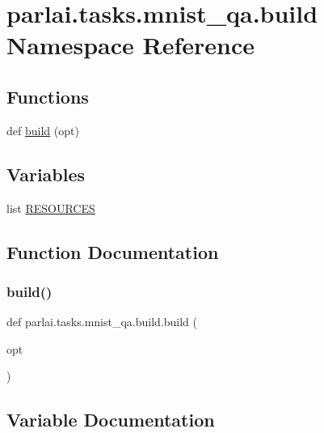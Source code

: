 \hypertarget{namespaceparlai_1_1tasks_1_1mnist__qa_1_1build}{}\section{parlai.\+tasks.\+mnist\+\_\+qa.\+build Namespace Reference}
\label{namespaceparlai_1_1tasks_1_1mnist__qa_1_1build}
\subsection*{Functions}
\begin{DoxyCompactItemize}
\item 
def \hyperlink{namespaceparlai_1_1tasks_1_1mnist__qa_1_1build_a76b349ca8131ab96d2e9991090ec92bb}{build} (opt)
\end{DoxyCompactItemize}
\subsection*{Variables}
\begin{DoxyCompactItemize}
\item 
list \hyperlink{namespaceparlai_1_1tasks_1_1mnist__qa_1_1build_a8199288cab0278a6409a158b930adc23}{R\+E\+S\+O\+U\+R\+C\+ES}
\end{DoxyCompactItemize}


\subsection{Function Documentation}
\mbox{\label{namespaceparlai_1_1tasks_1_1mnist__qa_1_1build_a76b349ca8131ab96d2e9991090ec92bb}} 
\subsubsection{\texorpdfstring{build()}{build()}}
{\footnotesize\ttfamily def parlai.\+tasks.\+mnist\+\_\+qa.\+build.\+build (\begin{DoxyParamCaption}\item[{}]{opt }\end{DoxyParamCaption})}



\subsection{Variable Documentation}
\mbox{\label{namespaceparlai_1_1tasks_1_1mnist__qa_1_1build_a8199288cab0278a6409a158b930adc23}} 
